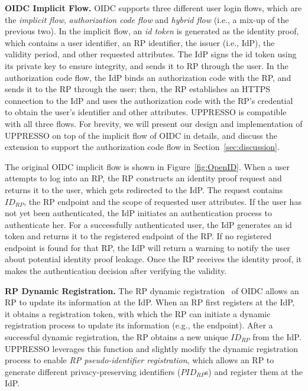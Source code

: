 \vspace{1mm}\noindent\textbf{OIDC Implicit Flow.}
 OIDC supports three different user login flows, which are the {\em implicit flow}, {\em authorization code flow} and {\em hybrid flow} (i.e., a mix-up of the previous two).
 In the implicit flow, an {\em id token} is generated as the identity proof, which contains a user identifier, an RP identifier,
    the issuer (i.e., IdP), the validity period, and other requested attributes.
The IdP signs the id token using its private key to ensure integrity, and sends it to RP through the user.
In the authorization code flow, the IdP binds an authorization code with the RP, and sends it to the RP through the user;
then, the RP establishes an HTTPS connection to the IdP %
    and uses the authorization code with the RP's credential to obtain the user's identifier and other attributes.
UPPRESSO is compatible with all three flows. For brevity, we will present our design and implementation of UPPRESSO on top of the implicit flow of OIDC in details, and discuss the extension to support the authorization code flow in Section~\ref{sec:discussion}.

{\color{red}
The original OIDC implicit flow is shown in Figure~\ref{fig:OpenID}. When a user attempts to log into an RP,
    the RP constructs an identity proof request and returns it to the user, which gets redirected to the IdP.
The request contains $ID_{RP}$, the RP endpoint and the scope of requested user attributes.
If the user has not yet been authenticated, the IdP initiates an authentication process to authenticate her.
For a successfully authenticated user, the IdP generates an id token  and returns it to the registered endpoint of the RP.
If no registered endpoint is found for that RP,
    the IdP will return a warning to notify the user about potential identity proof leakage.
Once the RP receives the identity proof, it makes the authentication decision after verifying the validity.}

\vspace{1mm}\noindent\textbf{RP Dynamic Registration.} The RP dynamic registration~\cite{DynamicRegistration} of OIDC allows an RP to update its information at the IdP. When an RP first registers at the IdP, it obtains a registration token, with which the RP can initiate a dynamic registration process to update its information (e.g., the endpoint).
After a successful dynamic registration, the RP obtains a new unique $ID_{RP}$ from the IdP.
UPPRESSO leverages this function and slightly modify the dynamic registration process to enable {\em RP pseudo-identifier registration},
 which allows an RP to generate different privacy-preserving identifiers ($PID_{RP}$s) and register them at the IdP.

